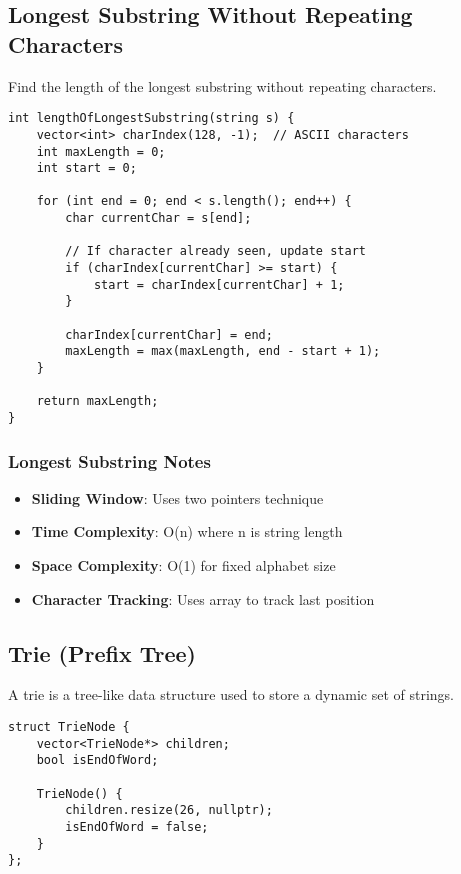 \documentclass[11pt,a4paper]{article}
\begin{document}
\newpage
\subsection{Longest Substring Without Repeating Characters}
Find the length of the longest substring without repeating characters.

\begin{lstlisting}[caption={Longest Substring Without Repeating Characters}]
int lengthOfLongestSubstring(string s) {
    vector<int> charIndex(128, -1);  // ASCII characters
    int maxLength = 0;
    int start = 0;
    
    for (int end = 0; end < s.length(); end++) {
        char currentChar = s[end];
        
        // If character already seen, update start
        if (charIndex[currentChar] >= start) {
            start = charIndex[currentChar] + 1;
        }
        
        charIndex[currentChar] = end;
        maxLength = max(maxLength, end - start + 1);
    }
    
    return maxLength;
}
\end{lstlisting}

\subsubsection{Longest Substring Notes}
\begin{itemize}
\item \textbf{Sliding Window}: Uses two pointers technique
\item \textbf{Time Complexity}: O(n) where n is string length
\item \textbf{Space Complexity}: O(1) for fixed alphabet size
\item \textbf{Character Tracking}: Uses array to track last position
\end{itemize}

\newpage
\subsection{Trie (Prefix Tree)}
A trie is a tree-like data structure used to store a dynamic set of strings.

\begin{lstlisting}[caption={Trie Node Implementation}]
struct TrieNode {
    vector<TrieNode*> children;
    bool isEndOfWord;
    
    TrieNode() {
        children.resize(26, nullptr);
        isEndOfWord = false;
    }
};
\end{lstlisting}
\end{document}
